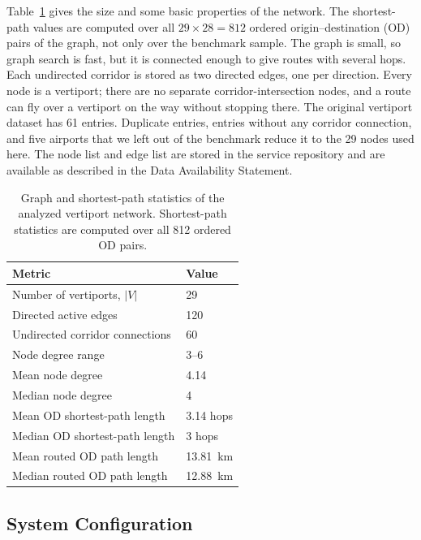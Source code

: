 Table~\ref{tab:network_stats} gives the size and some basic properties of the network. The shortest-path values are computed over all \(29 \times 28 = 812\) ordered origin--destination (OD) pairs of the graph, not only over the benchmark sample. The graph is small, so graph search is fast, but it is connected enough to give routes with several hops. Each undirected corridor is stored as two directed edges, one per direction. Every node is a vertiport; there are no separate corridor-intersection nodes, and a route can fly over a vertiport on the way without stopping there. The original vertiport dataset has 61 entries. Duplicate entries, entries without any corridor connection, and five airports that we left out of the benchmark reduce it to the 29 nodes used here. The node list and edge list are stored in the service repository and are available as described in the Data Availability Statement.

\begin{table}[H]
    \centering
    \caption{Graph and shortest-path statistics of the analyzed vertiport network. Shortest-path statistics are computed over all 812 ordered OD pairs.}
    \label{tab:network_stats}
    \begin{tabularx}{\textwidth}{lX}
        \toprule
        Metric & Value \\
        \midrule
        Number of vertiports, \(|V|\) & 29 \\
        Directed active edges & 120 \\
        Undirected corridor connections & 60 \\
        Node degree range & 3--6 \\
        Mean node degree & 4.14 \\
        Median node degree & 4 \\
        Mean OD shortest-path length & 3.14 hops \\
        Median OD shortest-path length & 3 hops \\
        Mean routed OD path length & \SI{13.81}{km} \\
        Median routed OD path length & \SI{12.88}{km} \\
        \bottomrule
    \end{tabularx}
\end{table}

\subsection{System Configuration}
\label{sec:system_configuration}

